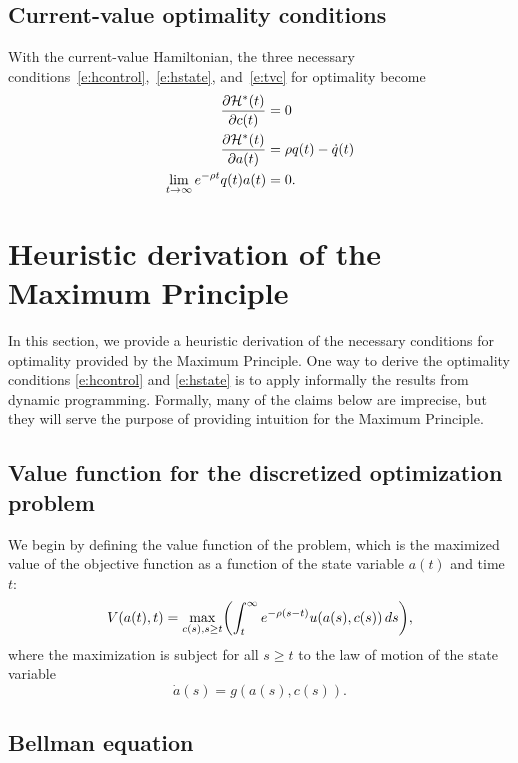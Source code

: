 \documentclass[letterpaper, 11pt, leqno]{article}
\begin{document}
\subsection{Current-value optimality conditions}

With the current-value Hamiltonian, the three necessary conditions~\eqref{e:hcontrol},~\eqref{e:hstate}, and~\eqref{e:tvc} for optimality become
\begin{align*}
\pd{\Hc^{*}(t)}{c(t)} &=0\\
\pd{\Hc^{*}(t)}{a(t)} &=\r q(t)-\dot{q}(t)\\
\lim_{t\to \infty}e^{-\r t}q(t)a(t)&=0. 
\end{align*}

\section{Heuristic derivation of the Maximum Principle}\label{sec:HEURISTIC}

In this section, we provide a heuristic derivation of the necessary conditions for optimality provided by the Maximum Principle. One way to derive the optimality conditions \eqref{e:hcontrol} and \eqref{e:hstate} is to apply informally the results from dynamic programming. Formally, many of the claims below are imprecise, but they will serve the purpose of providing intuition for the Maximum Principle.

\subsection{Value function for the discretized optimization problem}

We begin by defining the value function of the problem, which is the maximized value of the objective function as a function of the
state variable $a(t)$ and time $t$:
\begin{equation*}
V(a(t),t) = \max[c(s), s\ge t]{\int_{t}^{\infty}e^{-\r (s-t)}u(a(s),c(s))\,ds},
\end{equation*}
where the maximization is subject for all $s\ge t$ to the law of motion of the state variable
\begin{equation}
\dot{a}(s)=g(a(s),c(s)).
\label{e:lmh}\end{equation}

\subsection{Bellman equation}
\end{document}
